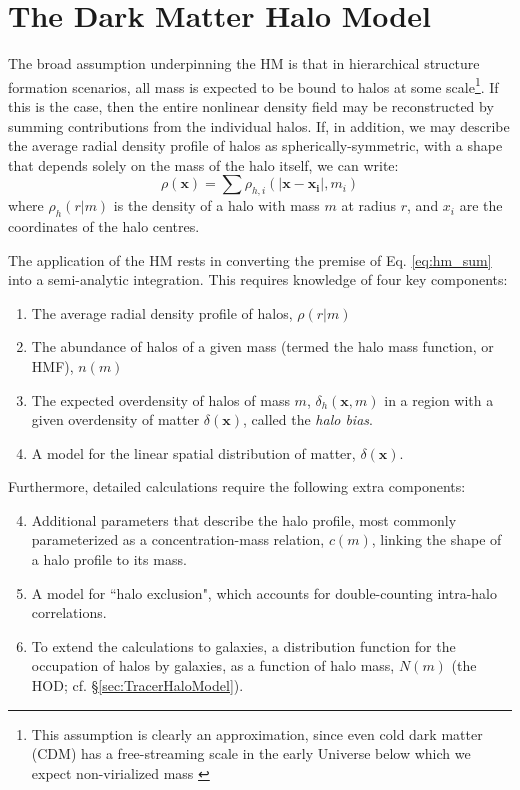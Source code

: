 \documentclass[5p,aas_macros]{elsarticle}
\begin{document}
\section{The Dark Matter Halo Model}
\label{sec:DMHaloModel}
The broad assumption underpinning the HM is that in hierarchical structure formation scenarios, all mass is expected to be bound to halos at some scale\footnote{This assumption is clearly an approximation, since even cold dark matter (CDM) has a free-streaming scale in the early Universe below which we expect non-virialized mass \citep{Frenk2012,Schneider2014a}}. If this is the case, then the entire nonlinear density field may be reconstructed by summing contributions from the individual halos. If, in addition, we may describe the average radial density profile of halos as spherically-symmetric, with a shape that depends solely on the mass of the halo itself, we can write:
\begin{equation}
    \label{eq:hm_sum}
    \rho(\mathbf{x}) = \sum \rho_{h,i}(|\mathbf{x} - \mathbf{x_i}|,m_i)
\end{equation}
where $\rho_{h}(r|m)$ is the density of a halo with mass $m$ at radius $r$, and $x_i$ are the coordinates of the halo centres. 

The application of the HM rests in converting the prem\-ise of Eq. \ref{eq:hm_sum} into a semi-analytic integration. This requires knowledge of four key components:
\begin{enumerate}
    \item The average radial density profile of halos, $\rho(r|m)$
    \item The abundance of halos of a given mass (termed the halo mass function, or HMF), $n(m)$
    \item The expected overdensity of halos of mass $m$, $\delta_h(\mathbf{x},m)$ in a region with a given overdensity of matter $\delta(\mathbf{x})$, called the \textit{halo bias}.
    \item A model for the linear spatial distribution of matter, $\delta(\mathbf{x})$.
\end{enumerate}
Furthermore, detailed calculations require the following extra components:
\begin{enumerate}
    \setcounter{enumi}{3}
    \item Additional parameters that describe the halo profile, most
    commonly parameterized as a concentration-mass relation, $c(m)$, linking the shape of a halo profile to its mass.
    \item A model for ``halo exclusion", which accounts for double-counting intra-halo correlations.
    \item To extend the calculations to galaxies, a distribution function for the occupation of halos by galaxies, as a function of halo mass, $N(m)$ (the HOD; cf. \S\ref{sec:TracerHaloModel}). 
\end{enumerate}
\end{document}
